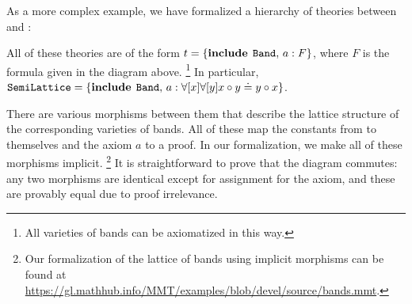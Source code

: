 As a more complex example, we have formalized a hierarchy of theories between  and :
\begin{center}
\end{center}
All of these theories are of the form $t=\{\operatorname{\mathbf{include}}{\;\operatorname{\mathtt{Band}}},\,a: F\}$, where $F$ is the formula given in the diagram above.%
\footnote{All varieties of bands can be axiomatized in this way.}
In particular, $\operatorname{\mathtt{SemiLattice}}=\{\operatorname{\mathbf{include}}{\;\operatorname{\mathtt{Band}}},\,a: \forall [x]\forall [y] x\circ y\doteq y\circ x\}$.

There are various morphisms between them that describe the lattice structure of the corresponding varieties of bands.
All of these map the constants from  to themselves and the axiom $a$ to a proof.
In our formalization, we make all of these morphisms implicit.%
\footnote{Our formalization of the lattice of bands using implicit morphisms can be found at \url{https://gl.mathhub.info/MMT/examples/blob/devel/source/bands.mmt}.}
It is straightforward to prove that the diagram commutes: any two morphisms are identical except for assignment for the axiom, and these are provably equal due to proof irrelevance.

